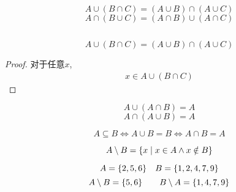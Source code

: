 \begin{frame}{}
  \begin{theorem}
    \[
      A \cup (B \cap C) = (A \cup B) \cap (A \cup C)
    \]
    \[
      A \cap (B \cup C) = (A \cap B) \cup (A \cap C)
    \]
  \end{theorem}

  \begin{columns}
      \pause
      \pause
  \end{columns}
\end{frame}

\begin{frame}{}
  \begin{theorem}
    \[
      A \cup (B \cap C) = (A \cup B) \cap (A \cup C)
    \]
  \end{theorem}

  \begin{proof}
    对于任意$x$,
    \begin{align}
      x \in A \cup (B \cap C)
    \end{align}
  \end{proof}
\end{frame}

\begin{frame}{}
  \begin{theorem}
    \[
      A \cup (A \cap B) = A
    \]
    \[
      A \cap (A \cup B) = A
    \]
  \end{theorem}
\end{frame}

\begin{frame}{}
  \begin{theorem}
    \[
      A \subseteq B \iff A \cup B = B \iff A \cap B = A
    \]
  \end{theorem}
\end{frame}

\begin{frame}{}
  \begin{definition}
    \[
      A \setminus B = \{x \mid x \in A \land x \notin B\}
    \]
  \end{definition}

  \vspace{0.30cm}
  \[
    A = \{2, 5, 6\} \quad B = \{1, 2, 4, 7, 9\}
  \]
  \[
    A \setminus B = \{5, 6\} \qquad
    B \setminus A = \{1, 4, 7, 9\}
  \]
\end{frame}

